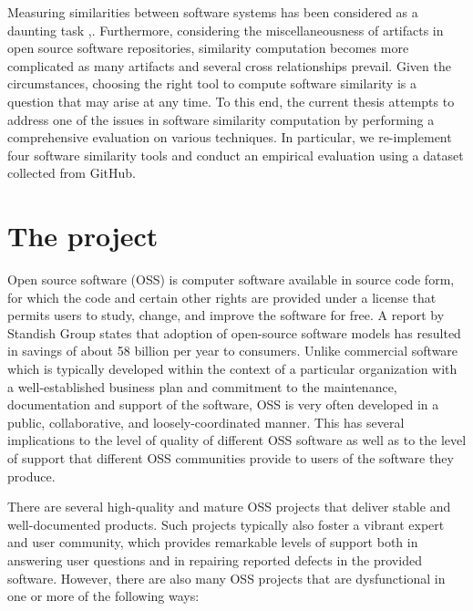Measuring similarities between software systems has been considered as a daunting task \cite{Chen:2015:SFD:2684822.2685305},\cite{McMillan:2012:DSS:2337223.2337267}. Furthermore, considering the miscellaneousness of artifacts in open source software repositories, similarity computation becomes more complicated as many artifacts and several cross relationships prevail. Given the circumstances, choosing the right tool to compute software similarity is a question that may arise at any time. To this end, the current thesis attempts to address one of the issues in software similarity computation by performing a comprehensive evaluation on various techniques. In particular, we re-implement four software similarity tools and conduct an empirical evaluation using a dataset collected from GitHub.






\section{The \CROSSMINER project}

Open source software (OSS) is computer software available in source code form, for which the code and certain other rights are provided under a license that permits users to study, change, and improve the software for free. A report by Standish Group states that adoption of open-source software models has resulted in savings of about 58 billion per year to consumers. Unlike commercial software which is typically developed within the context of a particular organization with a well-established business plan and commitment to the maintenance, documentation and support of the software, OSS is very often developed in a public, collaborative, and loosely-coordinated manner. This has several implications to the level of quality of different OSS software as well as to the level of support that different OSS communities provide to users of the software they produce.

There are several high-quality and mature OSS projects that deliver stable and well-documented products. Such projects typically also foster a vibrant expert and user community, which provides remarkable levels of support both in answering user questions and in repairing reported defects in the provided software. However, there are also many OSS projects that are dysfunctional in one or more of the following ways:

